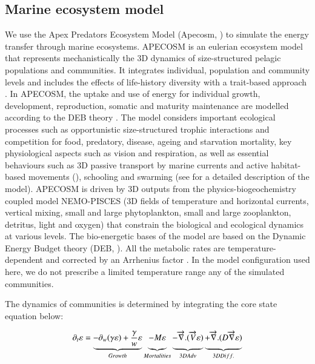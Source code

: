 \subsection{Marine ecosystem model}
\label{sec:apecosm}

We use the Apex Predators Ecosystem Model (Apecosm, \citealp{mauryModelingEnvironmentalEffects2007, mauryOverviewAPECOSMSpatialized2010}) to simulate the energy transfer through marine ecosystems. 
APECOSM is an eulerian ecosystem model that represents mechanistically the 3D dynamics of size-structured pelagic populations and communities. It integrates individual, population and community levels and includes the effects of life-history diversity with a trait-based approach \citep{mauryIndividualsPopulationsCommunities2013}. In APECOSM, the uptake and use of energy for individual growth, development, reproduction, somatic and maturity maintenance are modelled according to the DEB theory \citep{koojmanDynamicEnergyBudget2010}. The model considers important ecological processes such as opportunistic size-structured trophic interactions and competition for food, predatory, disease, ageing and starvation mortality, key physiological aspects such as vision and respiration, as well as essential behaviours such as 3D passive transport by marine currents and active habitat-based movements (\cite{faugerasAdvectiondiffusionreactionSizestructuredFish2005}), schooling and swarming (see \citealp{mauryModelingEnvironmentalEffects2007, mauryIndividualsPopulationsCommunities2013, mauryCanSchoolingRegulate2017} for a detailed description of the model). APECOSM is driven by 3D outputs from the physics-biogeochemistry coupled model NEMO-PISCES (3D fields of temperature and horizontal currents, vertical mixing, small and large phytoplankton, small and large zooplankton, detritus, light and oxygen) that constrain the biological and ecological dynamics at various levels.
The bio-energetic bases of the model are based on the Dynamic Energy Budget theory (DEB, \citealp{koojmanDynamicEnergyBudget2010}). All the metabolic rates are temperature-dependent and corrected by an Arrhenius factor \citep{mauryModelingEnvironmentalEffects2007, mauryIndividualsPopulationsCommunities2013}. In the model configuration used here, we do not prescribe a limited temperature range any of the simulated communities.

The dynamics of communities is determined by integrating the core state equation below:

\begin{equation}
\partial_t \varepsilon = \underbrace{- \partial_w(\gamma \varepsilon) + \frac{\gamma}{w}\varepsilon}_{Growth} 
\underbrace{- M \varepsilon \vphantom{\frac{\gamma}{w}\varepsilon}}_{Mortalities}
\underbrace{-\overrightarrow{\nabla}.(\overrightarrow{V} \varepsilon) \vphantom{\frac{\gamma}{w}\varepsilon}}_{3D Adv} 
\underbrace{+ \overrightarrow{\nabla} . (D \overrightarrow{\nabla} \varepsilon) \vphantom{\frac{\gamma}{w}\varepsilon}}_{3D Diff.}
\label{eq:apecosm_trend}
\end{equation}


